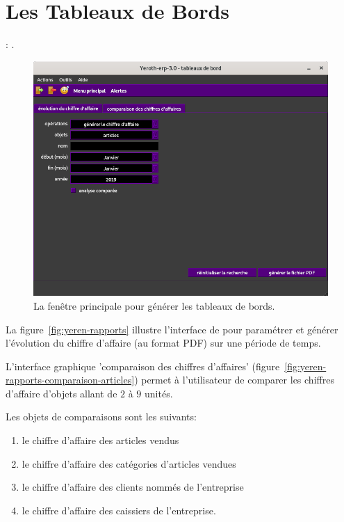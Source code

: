 \chapter{Les Tableaux de Bords}\label{chap:tableaux-de-bord}

\utilisateurs: \lienmanager.\\


\label{sec:tableaux-introduction}

\begin{figure}[!htbp]
	\centering
	\includegraphics[scale=0.45]{images/yeren-rapports.png}
	\caption{La fen\^etre principale pour g\'en\'erer les tableaux de bords.}
	\label{fig:yeroth-tableaux}
\end{figure}

La figure~\ref{fig:yeren-rapports} illustre l'interface
de \yeren pour param\'etrer et g\'en\'erer l'\'evolution
du chiffre d'affaire (au format PDF) sur une p\'eriode de temps.

L'interface graphique 'comparaison des chiffres d'affaires'
(figure~\ref{fig:yeren-rapports-comparaison-articles})
permet \`a l'utilisateur de comparer les chiffres
d'affaire d'objets allant de $2$ \`a $9$ unit\'es.

Les objets de comparaisons sont les suivants:
\begin{enumerate}[1)]
	\item le chiffre d'affaire des articles vendus
	\item le chiffre d'affaire des cat\'egories d'articles vendues
	\item le chiffre d'affaire des clients nomm\'es de l'entreprise
	\item le chiffre d'affaire des caissiers de l'entreprise.\\
\end{enumerate}

